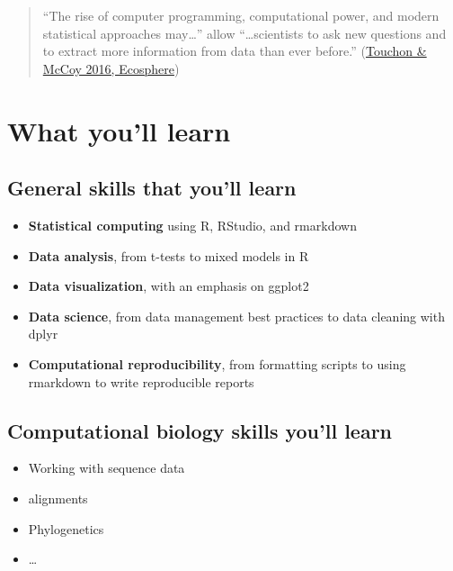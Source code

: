 \documentclass[
]{book}
\providecommand{\tightlist}{%
  \setlength{\itemsep}{0pt}\setlength{\parskip}{0pt}}
\begin{document}
\begin{quote}
``The rise of computer programming, computational power, and modern statistical approaches may\ldots{}'' allow ``\ldots scientists to ask new questions and to extract more information from data than ever before.'' (\href{https://esajournals.onlinelibrary.wiley.com/doi/abs/10.1002/ecs2.1394}{Touchon \& McCoy 2016, Ecosphere})
\end{quote}

\hypertarget{what-youll-learn}{%
\section{What you'll learn}\label{what-youll-learn}}

\hypertarget{general-skills-that-youll-learn}{%
\subsection{General skills that you'll learn}\label{general-skills-that-youll-learn}}

\begin{itemize}
\tightlist
\item
  \textbf{Statistical computing} using R, RStudio, and rmarkdown
\item
  \textbf{Data analysis}, from t-tests to mixed models in R
\item
  \textbf{Data visualization}, with an emphasis on ggplot2
\item
  \textbf{Data science}, from data management best practices to data cleaning with dplyr
\item
  \textbf{Computational reproducibility}, from formatting scripts to using rmarkdown to write reproducible reports
\end{itemize}

\hypertarget{computational-biology-skills-youll-learn}{%
\subsection{Computational biology skills you'll learn}\label{computational-biology-skills-youll-learn}}

\begin{itemize}
\tightlist
\item
  Working with sequence data
\item
  alignments
\item
  Phylogenetics
\item
  \ldots{}
\end{itemize}
\end{document}
